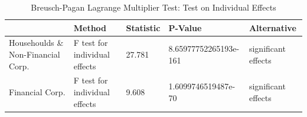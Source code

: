 \begin{table}[ht]
\centering
\caption{Breusch-Pagan Lagrange Multiplier Test: Test on Individual Effects} 
\begingroup\small
\begin{tabular}{lllll}
  \toprule
 & Method & Statistic & P-Value & Alternative \\ 
  \midrule
Househoulds \& Non-Financial Corp. & F test for individual effects & 27.781 & 8.65977752265193e-161 & significant effects \\ 
  Financial Corp. & F test for individual effects & 9.608 & 1.6099746519487e-70 & significant effects \\ 
   \bottomrule
\end{tabular}
\endgroup
\end{table}
